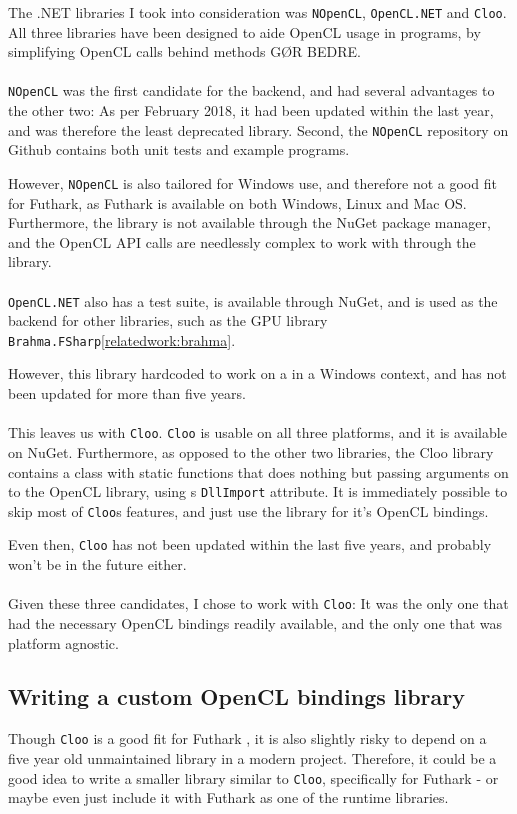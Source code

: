 The .NET libraries I took into consideration was \texttt{NOpenCL}, \texttt{OpenCL.NET} and \texttt{Cloo}.
All three libraries have been designed to aide OpenCL usage in \csharp{}
programs, by simplifying OpenCL calls behind methods GØR BEDRE.
\\
\\
\texttt{NOpenCL} was the first candidate for the \csharp{} backend, and had
several advantages to the other two: As per February 2018, it had been updated
within the last year, and was therefore the least deprecated library. Second,
the \texttt{NOpenCL} repository on Github contains both unit tests and
example programs.

However, \texttt{NOpenCL} is also tailored for Windows use, and therefore not a
good fit for Futhark, as Futhark is available on both Windows, Linux and Mac OS.
Furthermore, the library is not available through the NuGet
package manager, and the OpenCL API calls are needlessly complex to work with
through the library.
\\
\\
\texttt{OpenCL.NET} also has a test suite, is available through NuGet, and is
used as the backend for other libraries, such as the \fsharp{} GPU library
\texttt{Brahma.FSharp}\ref{relatedwork:brahma}.

However, this library hardcoded to work on a in a Windows context, and has not been
updated for more than five years.
\\
\\
This leaves us with \texttt{Cloo}. \texttt{Cloo} is usable on all three
platforms, and it is available on NuGet. Furthermore, as opposed to the other two libraries, the
Cloo library contains a class with static functions that does nothing but
passing arguments on to the OpenCL library, using \csharp{}s \texttt{DllImport}
attribute. It is immediately possible to skip most of \texttt{Cloo}s features,
and just use the library for it's OpenCL bindings.

Even then, \texttt{Cloo} has not been updated within the last five years, and
probably won't be in the future either.
\\
\\
Given these three candidates, I chose to work with \texttt{Cloo}: It was the
only one that had the necessary OpenCL bindings readily available, and the only
one that was platform agnostic.

\subsection{Writing a custom OpenCL bindings library}
Though \texttt{Cloo} is a good fit for Futhark \csharp{}, it is also slightly
risky to depend on a five year old unmaintained library in a modern project.
Therefore, it could be a good idea to write a smaller library similar to
\texttt{Cloo}, specifically for Futhark - or maybe even just include it with
Futhark as one of the \csharp{} runtime libraries. 

